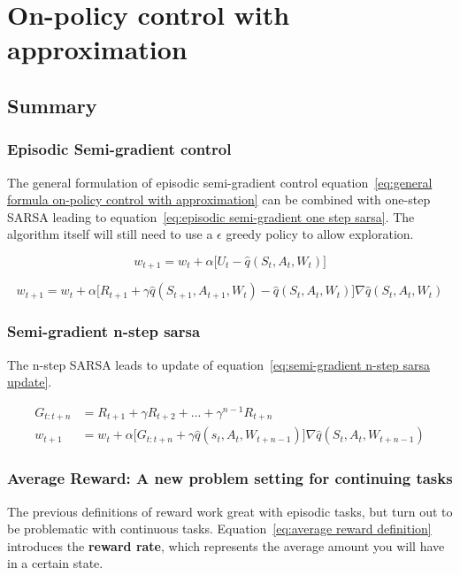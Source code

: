 \chapter{On-policy control with approximation}

\section{Summary}

\subsection{Episodic Semi-gradient control}

The general formulation of episodic semi-gradient control equation~\ref{eq:general formula on-policy control with approximation} can be combined with one-step SARSA leading to equation~\ref{eq:episodic semi-gradient one step sarsa}. The algorithm itself will still need to use a $\epsilon$ greedy policy to allow exploration.

\begin{equation}
	w_{t+1} = w_t + \alpha \big[ U_t - \hat{q}(S_t, A_t, W_t) \big] 
\label{eq:general formula on-policy control with approximation}
\end{equation}

\begin{equation}
w_{t+1} = w_t + \alpha \big[R_{t+1} + \gamma\hat{q}(S_{t+1}, A_{t+1},W_t) - \hat{q}(S_t, A_t, W_t) \big] \nabla \hat{q}(S_t, A_t, W_t)
\label{eq:episodic semi-gradient one step sarsa}
\end{equation}

\subsection{Semi-gradient n-step sarsa}
The n-step SARSA leads to update of equation~\ref{eq:semi-gradient n-step sarsa update}.

\begin{equation}
\begin{split}
G_{t:t+n} & = R_{t+1} + \gamma R_{t+2} + ... + \gamma^{n-1} R_{t+n} \\
w_{t+1} & = w_t + \alpha \big[G_{t:t+n} + \gamma \hat{q}(s_{t}, A_{t}, W_{t+n-1}) \big] \nabla \hat{q}(S_{t}, A_{t}, W_{t+n-1})
\end{split}
\label{eq:semi-gradient n-step sarsa update}
\end{equation}

\subsection{Average Reward: A new problem setting for continuing tasks}
The previous definitions of reward work great with episodic tasks, but turn out to be problematic with continuous tasks. Equation~\ref{eq:average reward definition}
introduces the \textbf{reward rate}, which represents the average amount you will have in a certain state. 

